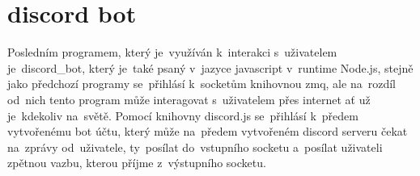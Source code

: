 \section{discord bot}

Posledním programem, který je~využíván k~interakci s~uživatelem je~discord\_bot, který je~také psaný v~jazyce javascript v~runtime Node.js, stejně jako předchozí programy se~přihlásí k~socketům knihovnou zmq, ale na~rozdíl od~nich tento program může interagovat s~uživatelem přes internet ať už je~kdekoliv na~světě.
Pomocí knihovny discord.js se~přihlásí k~předem vytvořenému bot účtu, který může na~předem vytvořeném discord serveru čekat na~zprávy od~uživatele, ty~posílat do~vstupního socketu a~posílat uživateli zpětnou vazbu, kterou příjme z~výstupního socketu.

